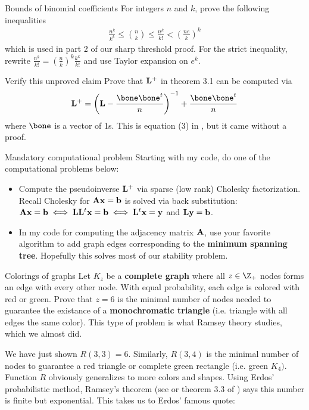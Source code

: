 \documentclass[./some_latex_template.tex]{subfiles}
\begin{document}
\begin{problembox}{Bounds of binomial coefficients}{}
For integers $n$ and $k$, prove the following inequalities
\begin{align*}
	\frac{n^k}{k^k} \le {n \choose k} \le \frac{n^k}{k!} < \left( \frac{ne}{k}\right)^k
\end{align*}
which is used in part 2 of our sharp threshold proof. For the strict inequality, rewrite $\frac{n^k}{k!} = \left(\frac{n}{k}\right)^k \frac{k^k}{k!}$ and use Taylor expansion on $e^k$.
\end{problembox}

\begin{problembox}{Verify this unproved claim}{}
Prove that $\mathbf{L}^+$ in theorem 3.1 can be computed via
\begin{align*}
	\bL^+ = \left(\bL - \frac{ \bone\bone^t }{n}\right)^{-1} + \frac{\bone\bone^t}{n}
\end{align*}
where $\bone$ is a vector of 1s. This is equation (3) in \cite{fouss2007random}, but it came without a proof.
\end{problembox}

\begin{problembox}{Mandatory computational problem}{}
Starting with my code, do one of the computational problems below: 
\begin{itemize}
	\item Compute the pseudoinverse $\mathbf{L}^+$ via sparse (low rank) Cholesky factorization. Recall Cholesky for $\mathbf{A}\mathbf{x} = \mathbf{b}$ is solved via back substitution: $\mathbf{A}\mathbf{x} = \mathbf{b} \iff \mathbf{L}\mathbf{L}^t\mathbf{x} = \mathbf{b} \iff \mathbf{L}^t\mathbf{x} = \mathbf{y}$ and $\mathbf{L}\mathbf{y} = \mathbf{b}$.
	\item In my code for computing the adjacency matrix $\mathbf{A}$, use your favorite algorithm to add graph edges corresponding to the \textbf{minimum spanning tree}. Hopefully this solves most of our stability problem. 
\end{itemize}
\end{problembox}

\begin{problembox}{Colorings of graphs}{}
Let $K_z$ be a \textbf{complete graph} where all $z \in \Z_+$ nodes forms an edge with every other node. With equal probability, each edge is colored with red or green. Prove that $z=6$ is the minimal number of nodes needed to guarantee the existance of a \textbf{monochromatic triangle} (i.e. triangle with all edges the same color). This type of problem is what Ramsey theory studies, which we almost did. 
\end{problembox}
We have just shown $R(3, 3) = 6$. Similarly, $R(3, 4)$ is the minimal number of nodes to guarantee a red triangle or complete green rectangle (i.e. green $K_4)$. Function $R$ obviously generalizes to more colors and shapes. Using Erdos' probabilistic method, Ramsey's theorem (see \cite{sebv} or theorem 3.3 of \cite{van2001course}) says this number is finite but exponential.  This takes us to Erdos' famous quote:
\end{document}

